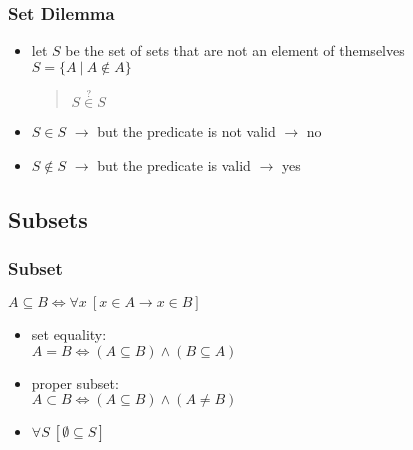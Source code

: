 \documentclass[dvipsnames]{beamer}
\begin{document}
\begin{frame}
  \frametitle{Set Dilemma}

  \begin{itemize}
    \item let $S$ be the set of sets that are not an element of themselves\\
      $S = \{A~|~A \notin A\}$

    \pause
    \smallskip
    \begin{quote}
      $S \stackrel{?}{\in} S$
    \end{quote}

    \pause
    \item $S \in S$ $\rightarrow$ but the predicate is not valid $\rightarrow$ no

    \pause
    \item $S \notin S$ $\rightarrow$ but the predicate is valid $\rightarrow$ yes
  \end{itemize}
\end{frame}

\subsection{Subsets}

\begin{frame}
  \frametitle{Subset}

  \begin{definition}
    $A \subseteq B \Leftrightarrow \forall x~[x \in A \rightarrow x \in B]$
  \end{definition}

  \pause
  \begin{itemize}
    \item \alert{set equality}:\\
      $A = B \Leftrightarrow (A \subseteq B) \wedge (B \subseteq A)$

    \item \alert{proper subset}:\\
      $A \subset B \Leftrightarrow (A \subseteq B) \wedge (A \neq B)$

    \pause
    \item $\forall S~[\emptyset \subseteq S]$
  \end{itemize}
\end{frame}
\end{document}
